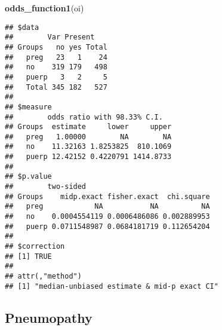 \documentclass[
]{article}
\newenvironment{Shaded}{\begin{snugshade}}{\end{snugshade}}
\newcommand{\DataTypeTok}[1]{\textcolor[rgb]{0.13,0.29,0.53}{#1}}
\newcommand{\KeywordTok}[1]{\textcolor[rgb]{0.13,0.29,0.53}{\textbf{#1}}}
\newcommand{\NormalTok}[1]{#1}
\newcommand{\OperatorTok}[1]{\textcolor[rgb]{0.81,0.36,0.00}{\textbf{#1}}}
\newcommand{\OtherTok}[1]{\textcolor[rgb]{0.56,0.35,0.01}{#1}}
\newcommand{\StringTok}[1]{\textcolor[rgb]{0.31,0.60,0.02}{#1}}
\begin{document}
\begin{Shaded}
\begin{Highlighting}[]
\KeywordTok{odds_function1}\NormalTok{(oi)}
\end{Highlighting}
\end{Shaded}

\begin{verbatim}
## $data
##        Var Present
## Groups   no yes Total
##   preg   23   1    24
##   no    319 179   498
##   puerp   3   2     5
##   Total 345 182   527
## 
## $measure
##        odds ratio with 98.33% C.I.
## Groups  estimate     lower     upper
##   preg   1.00000        NA        NA
##   no    11.32163 1.8253825  810.1069
##   puerp 12.42152 0.4220791 1414.8733
## 
## $p.value
##        two-sided
## Groups    midp.exact fisher.exact  chi.square
##   preg            NA           NA          NA
##   no    0.0004554119 0.0006486086 0.002889953
##   puerp 0.0711548987 0.0684181719 0.112654204
## 
## $correction
## [1] TRUE
## 
## attr(,"method")
## [1] "median-unbiased estimate & mid-p exact CI"
\end{verbatim}

\hypertarget{pneumopathy}{%
\subsection{Pneumopathy}\label{pneumopathy}}

\begin{Shaded}
\end{Shaded}

\begin{Shaded}
\end{Shaded}
\end{document}
